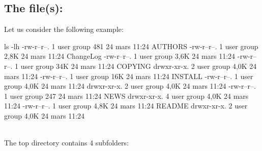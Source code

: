 \clearpage
\vspace{-1cm}
\subsection{The file(s): }

Let us consider the following example:
{\footnotesize{
\begin{script}
 ls -lh
-rw-r--r--. 1 user group  481 24 mars  11:24 AUTHORS
-rw-r--r--. 1 user group 2,8K 24 mars  11:24 ChangeLog
-rw-r--r--. 1 user group 3,6K 24 mars  11:24 
-rw-r--r--. 1 user group  34K 24 mars  11:24 COPYING
drwxr-xr-x. 2 user group 4,0K 24 mars  11:24 
-rw-r--r--. 1 user group  16K 24 mars  11:24 INSTALL
-rw-r--r--. 1 user group 4,0K 24 mars  11:24 
drwxr-xr-x. 2 user group 4,0K 24 mars  11:24 
-rw-r--r--. 1 user group  247 24 mars  11:24 NEWS
drwxr-xr-x. 4 user group 4,0K 24 mars  11:24 
-rw-r--r--. 1 user group 4,8K 24 mars  11:24 README
drwxr-xr-x. 2 user group 4,0K 24 mars  11:24 
\end{script}
}}
\vspace{-0.25cm}
\\
\noindent The top directory contains 4 subfolders:

